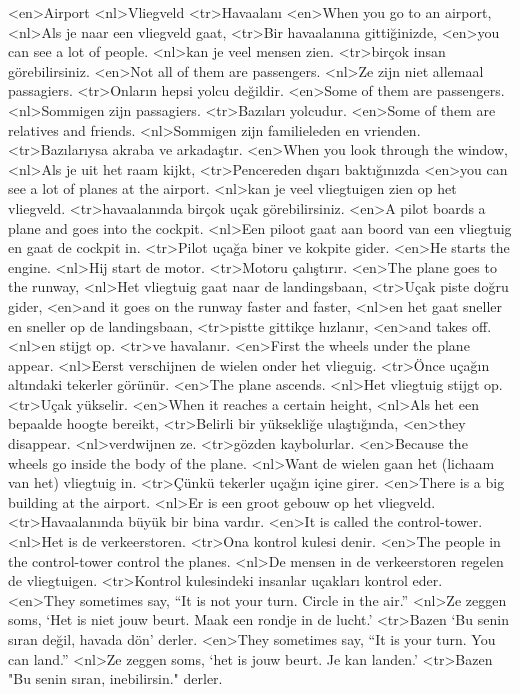 <en>Airport
<nl>Vliegveld 
<tr>Havaalanı
<en>When you go to an airport,
<nl>Als je naar een vliegveld gaat,
<tr>Bir havaalanına gittiğinizde,
<en>you can see a lot of people.
<nl>kan je veel mensen zien.
<tr>birçok insan görebilirsiniz.
<en>Not all of them are passengers.
<nl>Ze zijn niet allemaal passagiers.
<tr>Onların hepsi yolcu değildir.
<en>Some of them are passengers.
<nl>Sommigen zijn passagiers.
<tr>Bazıları yolcudur.
<en>Some of them are relatives and friends.
<nl>Sommigen zijn familieleden en vrienden.
<tr>Bazılarıysa akraba ve arkadaştır.
<en>When you look through the window,
<nl>Als je uit het raam kijkt, 
<tr>Pencereden dışarı baktığınızda
<en>you can see a lot of planes at the airport.
<nl>kan je veel vliegtuigen zien op het vliegveld.
<tr>havaalanında birçok uçak görebilirsiniz.
<en>A pilot boards a plane and goes into the cockpit.
<nl>Een piloot gaat aan boord van een vliegtuig en gaat de cockpit in.
<tr>Pilot uçağa biner ve kokpite gider.
<en>He starts the engine.
<nl>Hij start de motor.
<tr>Motoru çalıştırır.
<en>The plane goes to the runway,
<nl>Het vliegtuig gaat naar de landingsbaan,
<tr>Uçak piste doğru gider, 
<en>and it goes on the runway faster and faster,
<nl>en het gaat sneller en sneller op de landingsbaan,
<tr>pistte gittikçe hızlanır,
<en>and takes off.
<nl>en stijgt op.
<tr>ve havalanır.
<en>First the wheels under the plane appear.
<nl>Eerst verschijnen de wielen onder het vlieguig.
<tr>Önce uçağın altındaki tekerler görünür.
<en>The plane ascends.
<nl>Het vliegtuig stijgt op.
<tr>Uçak yükselir.
<en>When it reaches a certain height,
<nl>Als het een bepaalde hoogte bereikt, 
<tr>Belirli bir yüksekliğe ulaştığında,
<en>they disappear.
<nl>verdwijnen ze.
<tr>gözden kaybolurlar.
<en>Because the wheels go inside the body of the plane.
<nl>Want de wielen gaan het (lichaam van het) vliegtuig in.
<tr>Çünkü tekerler uçağın içine girer.
<en>There is a big building at the airport.
<nl>Er is een groot gebouw op het vliegveld.
<tr>Havaalanında büyük bir bina vardır.
<en>It is called the control-tower.
<nl>Het is de verkeerstoren.
<tr>Ona kontrol kulesi denir.
<en>The people in the control-tower control the planes.
<nl>De mensen in de verkeerstoren regelen de vliegtuigen.
<tr>Kontrol kulesindeki insanlar uçakları kontrol eder.
<en>They sometimes say, “It is not your turn. Circle in the air.”
<nl>Ze zeggen soms, `Het is niet jouw beurt. Maak een rondje in de lucht.'
<tr>Bazen ‘Bu senin sıran değil, havada dön’ derler.
<en>They sometimes say, “It is your turn. You can land.”
<nl>Ze zeggen soms, `het is jouw beurt. Je kan landen.'
<tr>Bazen "Bu senin sıran, inebilirsin." derler.
